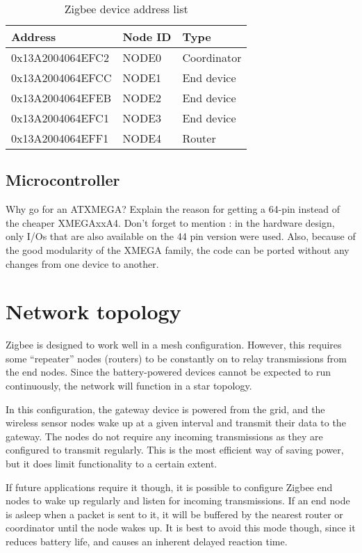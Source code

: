 \begin{table}[h]
  \centering
  \begin{tabular}{l|l|l}
    Address & Node ID & Type \\
    \hline
    0x13A2004064EFC2 & NODE0 & Coordinator \\
    0x13A2004064EFCC & NODE1 & End device \\
    0x13A2004064EFEB & NODE2 & End device \\
    0x13A2004064EFC1 & NODE3 & End device \\
    0x13A2004064EFF1 & NODE4 & Router \\
  \end{tabular}
  \caption{Zigbee device address list}
  \label{tab:addresses}
\end{table}

\subsection{Microcontroller}
Why go for an ATXMEGA?
Explain the reason for getting a 64-pin instead of the cheaper XMEGAxxA4.
Don't forget to mention : in the hardware design, only I/Os that are also
available on the 44 pin version were used. Also, because of the good modularity
of the XMEGA family, the code can be ported without any changes from one device
to another.


\section{Network topology}
\label{sec:network-topology}

Zigbee is designed to work well in a mesh configuration. However, this requires
some ``repeater'' nodes (routers) to be constantly on to relay transmissions
from the end nodes. Since the battery-powered devices cannot be expected to run
continuously, the network will function in a star topology.

In this configuration, the gateway device is powered from the grid, and the
wireless sensor nodes wake up at a given interval and transmit their data to the
gateway. The nodes do not require any incoming transmissions as they are
configured to transmit regularly. This is the most efficient way of saving
power, but it does limit functionality to a certain extent.

If future applications require it though, it is possible to configure Zigbee end
nodes to wake up regularly and listen for incoming transmissions. If an end node
is asleep when a packet is sent to it, it will be buffered by the nearest router
or coordinator until the node wakes up. It is best to avoid this mode though,
since it reduces battery life, and causes an inherent delayed reaction time.

